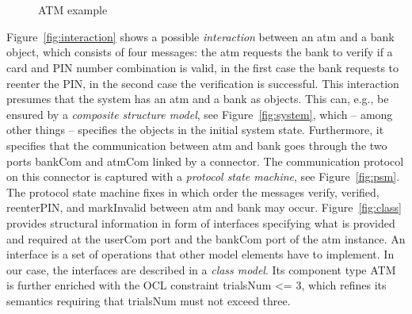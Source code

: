 \documentclass[10pt, a4paper]{isov2}
\renewcommand{\figurerefname}{Figure}
\renewcommand{\fref}[1]{\figurerefname~\ref{#1}}
\newcommand{\uml}[1]{\textsf{#1}}
\begin{document}
\begin{figure}[!ht]
\centering
{}
\hspace*{0.5cm}
\\
\hspace*{0.4cm}
\\
\vspace*{-1.5ex}
\caption{ATM example}\label{fig:atm-example}
\end{figure}

\fref{fig:interaction} shows a possible \emph{interaction} between
an \uml{atm} and a \uml{bank} object, which consists of four messages:
the \uml{atm} requests the \uml{bank} to \uml{verify} if a card and PIN
number combination is valid, in the first case the \uml{bank} requests
to reenter the PIN, in the second case the verification is successful.
This interaction presumes that the system has an \uml{atm} and a
\uml{bank} as objects. This can, e.g., be ensured by a \emph{composite
  structure model}, see Figure~\ref{fig:system}, which -- among other
things -- specifies the objects in the initial system state.
Furthermore, it specifies that the communication between \uml{atm} and
\uml{bank} goes through the two ports \uml{bankCom} and \uml{atmCom}
linked by a connector.  The communication protocol on this connector is
captured with a \emph{protocol state machine}, see Figure~\ref{fig:psm}.
The protocol state machine fixes in which order the messages
\uml{verify}, \uml{verified}, \uml{reenterPIN}, and \uml{markInvalid}
between \uml{atm} and \uml{bank} may occur.  Figure~\ref{fig:class}
provides structural information in form of interfaces specifying what is
provided and required at the \uml{userCom} port and the \uml{bankCom}
port of the \uml{atm} instance.  An interface is a set of operations
that other model elements have to implement. In our case, the
interfaces are described in a \emph{class model}. Its component type
\uml{ATM} is further enriched with the OCL
constraint \uml{trialsNum <= 3}, which refines its semantics requiring
that \uml{trialsNum} must not exceed three.
\end{document}
